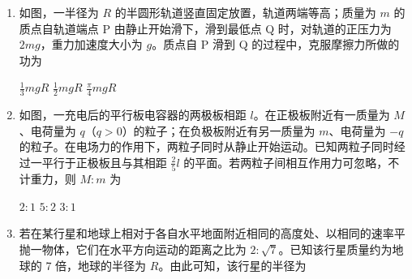 \documentclass[\gkver]{gaokaozhenti}
\begin{document}
\begin{enumerate}
{2 倍}
{$\sqrt{3}$ 倍}
{$\sqrt{2}$ 倍}


\item
如图，一半径为 $R$ 的半圆形轨道竖直固定放置，轨道两端等高；质量为 $m$ 的质点自轨道端点 P 由静止开始滑下，滑到最低点 Q 时，对轨道的正压力为 $2mg$，重力加速度大小为 $g$。质点自 P 滑到 Q 的过程中，克服摩擦力所做的功为


{$\frac{1}{3}mgR$}
{$\frac{1}{2}mgR$}
{$\frac{\pi}{4}mgR$}


\item
如图，一充电后的平行板电容器的两极板相距 $l$。在正极板附近有一质量为 $M$、电荷量为 $q$（$q>0$）的粒子；在负极板附近有另一质量为 $m$、电荷量为 $-q$ 的粒子。在电场力的作用下，两粒子同时从静止开始运动。已知两粒子同时经过一平行于正极板且与其相距 $\frac{2}{5}l$ 的平面。若两粒子间相互作用力可忽略，不计重力，则 $M:m$ 为


{$2:1$}
{$5:2$}
{$3:1$}


\item
若在某行星和地球上相对于各自水平地面附近相同的高度处、以相同的速率平抛一物体，它们在水平方向运动的距离之比为 $2:\sqrt{7}$。已知该行星质量约为地球的 7 倍，地球的半径为 $R$。由此可知，该行星的半径为


\end{enumerate}
\end{document}
